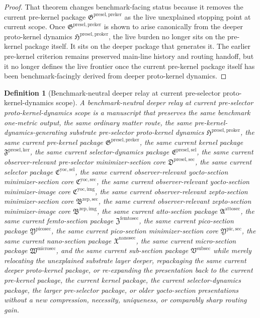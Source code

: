 \documentclass[11pt]{article}
\newcommand{\ProtoKernelPackage}{\mathfrak H^{\mathrm{presel,proker}}}
\newcommand{\PreKernelPackage}{\mathfrak G^{\mathrm{presel,preker}}}
\newcommand{\KernelPackage}{\mathfrak F^{\mathrm{presel,ker}}}
\newcommand{\PreSectionSelectorPackage}{\mathfrak E^{\mathrm{presel,sel}}}
\newcommand{\PreSelectorMinSectionCore}{\mathfrak D^{\mathrm{presel,sec}}}
\newcommand{\YoctoSelectorPackage}{\mathfrak C^{\mathrm{yoc,sel}}}
\newcommand{\YoctoImageCore}{\mathfrak C^{\mathrm{yoc,img}}}
\newcommand{\YoctoMinSectionCore}{\mathfrak C^{\mathrm{yoc,sec}}}
\newcommand{\ZeptoImageCore}{\mathfrak B^{\mathrm{zep,img}}}
\newcommand{\ZeptoMinSectionCore}{\mathfrak B^{\mathrm{zep,sec}}}
\newcommand{\AttoSectionPackage}{\mathfrak A^{\mathrm{attosec}}}
\newcommand{\FemtoSectionPackage}{\mathfrak Z^{\mathrm{femtosec}}}
\newcommand{\PicoSectionPackage}{\mathfrak Y^{\mathrm{picosec}}}
\newcommand{\PicoMinSectionCore}{\mathfrak Y^{\mathrm{pic,sec}}}
\newcommand{\NanoSectionPackage}{\mathfrak X^{\mathrm{nanosec}}}
\newcommand{\MicroSectionPackage}{\mathfrak W^{\mathrm{microsec}}}
\newcommand{\SubSectionPackage}{\mathfrak V^{\mathrm{subsec}}}
\newtheorem{definition}{Definition}
\begin{document}
\begin{proof}
That theorem changes benchmark-facing status because it removes the current pre-kernel package \(\PreKernelPackage\) as the live unexplained stopping point at current scope. Once \(\PreKernelPackage\) is shown to arise canonically from the deeper proto-kernel dynamics \(\ProtoKernelPackage\), the live burden no longer sits on the pre-kernel package itself. It sits on the deeper package that generates it. The earlier pre-kernel criterion remains preserved main-line history and routing handoff, but it no longer defines the live frontier once the current pre-kernel package itself has been benchmark-facingly derived from deeper proto-kernel dynamics.
\end{proof}

\begin{definition}[Benchmark-neutral deeper relay at current pre-selector proto-kernel-dynamics scope]
A \emph{benchmark-neutral deeper relay at current pre-selector proto-kernel-dynamics scope} is a manuscript that preserves the same benchmark one-metric output, the same ordinary matter route, the same pre-kernel-dynamics-generating substrate pre-selector proto-kernel dynamics \(\ProtoKernelPackage\), the same current pre-kernel package \(\PreKernelPackage\), the same current kernel package \(\KernelPackage\), the same current selector-dynamics package \(\PreSectionSelectorPackage\), the same current observer-relevant pre-selector minimizer-section core \(\PreSelectorMinSectionCore\), the same current selector package \(\YoctoSelectorPackage\), the same current observer-relevant yocto-section minimizer-section core \(\YoctoMinSectionCore\), the same current observer-relevant yocto-section minimizer-image core \(\YoctoImageCore\), the same current observer-relevant zepto-section minimizer-section core \(\ZeptoMinSectionCore\), the same current observer-relevant zepto-section minimizer-image core \(\ZeptoImageCore\), the same current atto-section package \(\AttoSectionPackage\), the same current femto-section package \(\FemtoSectionPackage\), the same current pico-section package \(\PicoSectionPackage\), the same current pico-section minimizer-section core \(\PicoMinSectionCore\), the same current nano-section package \(\NanoSectionPackage\), the same current micro-section package \(\MicroSectionPackage\), and the same current sub-section package \(\SubSectionPackage\) while merely relocating the unexplained substrate layer deeper, repackaging the same current deeper proto-kernel package, or re-expanding the presentation back to the current pre-kernel package, the current kernel package, the current selector-dynamics package, the larger pre-selector package, or older yocto-section presentations without a new compression, necessity, uniqueness, or comparably sharp routing gain.
\end{definition}
\end{document}
